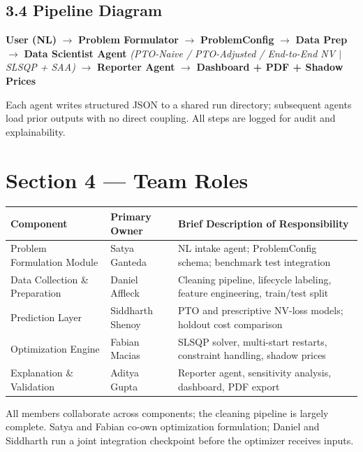 \documentclass[11pt]{article}
\begin{document}
\subsection*{3.4 \; Pipeline Diagram}

\begin{center}
\small
\textbf{User (NL)} $\!\rightarrow\!$ \textbf{Problem Formulator} $\!\rightarrow\!$ \textbf{ProblemConfig}
$\!\rightarrow\!$ \textbf{Data Prep} $\!\rightarrow\!$ \textbf{Data Scientist Agent}
\textit{(PTO-Naive / PTO-Adjusted / End-to-End NV $\mid$ SLSQP + SAA)}
$\!\rightarrow\!$ \textbf{Reporter Agent} $\!\rightarrow\!$ \textbf{Dashboard + PDF + Shadow Prices}
\end{center}

Each agent writes structured JSON to a shared run directory; subsequent agents load prior outputs
with no direct coupling. All steps are logged for audit and explainability.

\section{Section 4 — Team Roles}

\begin{center}
\small
\begin{tabular}{@{}p{4.3cm}p{3.5cm}p{6.4cm}@{}}
\toprule
\textbf{Component} & \textbf{Primary Owner} & \textbf{Brief Description of Responsibility} \\
\midrule
Problem Formulation Module     & Satya Ganteda    & NL intake agent; ProblemConfig schema; benchmark test integration \\
Data Collection \& Preparation & Daniel Affleck   & Cleaning pipeline, lifecycle labeling, feature engineering, train/test split \\
Prediction Layer               & Siddharth Shenoy & PTO and prescriptive NV-loss models; holdout cost comparison \\
Optimization Engine            & Fabian Macias    & SLSQP solver, multi-start restarts, constraint handling, shadow prices \\
Explanation \& Validation      & Aditya Gupta     & Reporter agent, sensitivity analysis, dashboard, PDF export \\
\bottomrule
\end{tabular}
\end{center}

\vspace{2pt}
All members collaborate across components; the cleaning pipeline is largely complete. Satya and Fabian
co-own optimization formulation; Daniel and Siddharth run a joint integration checkpoint before the
optimizer receives inputs.
\end{document}
